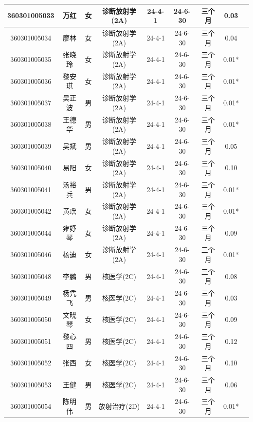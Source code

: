 \begin{table}[H]
\centering
\begin{tabular}{|c|c|c|c|c|c|c|c|c|}
\hline
360301005033 & 万红 & 女 & 诊断放射学(2A) & 24-4-1 & 24-6-30 & 三个月 & 0.03 &  \\
\hline
360301005034 & 廖林 & 女 & 诊断放射学(2A) & 24-4-1 & 24-6-30 & 三个月 & 0.04 &  \\
\hline
360301005035 & 张晓玲 & 女 & 诊断放射学(2A) & 24-4-1 & 24-6-30 & 三个月 & 0.01* &  \\
\hline
360301005036 & 黎安琪 & 女 & 诊断放射学(2A) & 24-4-1 & 24-6-30 & 三个月 & 0.01* &  \\
\hline
360301005037 & 吴正波 & 男 & 诊断放射学(2A) & 24-4-1 & 24-6-30 & 三个月 & 0.01* &  \\
\hline
360301005038 & 王德华 & 男 & 诊断放射学(2A) & 24-4-1 & 24-6-30 & 三个月 & 0.01* &  \\
\hline
360301005039 & 吴斌 & 男 & 诊断放射学(2A) & 24-4-1 & 24-6-30 & 三个月 & 0.05 &  \\
\hline
360301005040 & 易阳 & 女 & 诊断放射学(2A) & 24-4-1 & 24-6-30 & 三个月 & 0.10 &  \\
\hline
360301005041 & 汤裕兵 & 男 & 诊断放射学(2A) & 24-4-1 & 24-6-30 & 三个月 & 0.01* &  \\
\hline
360301005042 & 黄瑶 & 女 & 诊断放射学(2A) & 24-4-1 & 24-6-30 & 三个月 & 0.01* &  \\
\hline
360301005044 & 雍妤琴 & 女 & 诊断放射学(2A) & 24-4-1 & 24-6-30 & 三个月 & 0.09 &  \\
\hline
360301005046 & 杨迪 & 女 & 诊断放射学(2A) & 24-4-1 & 24-6-30 & 三个月 & 0.01* &  \\
\hline
360301005048 & 李鹏 & 男 & 核医学(2C) & 24-4-1 & 24-6-30 & 三个月 & 0.08 &  \\
\hline
360301005049 & 杨凭飞 & 男 & 核医学(2C) & 24-4-1 & 24-6-30 & 三个月 & 0.03 &  \\
\hline
360301005050 & 文晓琴 & 女 & 核医学(2C) & 24-4-1 & 24-6-30 & 三个月 & 0.09 &  \\
\hline
360301005051 & 黎心四 & 男 & 核医学(2C) & 24-4-1 & 24-6-30 & 三个月 & 0.12 &  \\
\hline
360301005052 & 张西 & 女 & 核医学(2C) & 24-4-1 & 24-6-30 & 三个月 & 0.10 &  \\
\hline
360301005053 & 王健 & 男 & 核医学(2C) & 24-4-1 & 24-6-30 & 三个月 & 0.06 &  \\
\hline
360301005054 & 陈明伟 & 男 & 放射治疗(2D) & 24-4-1 & 24-6-30 & 三个月 & 0.01* &  \\

\end{tabular}
\end{table}
